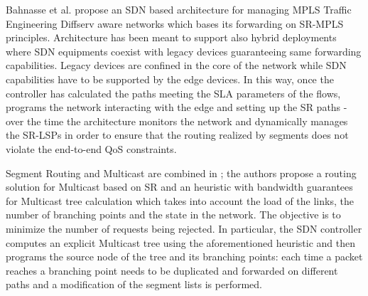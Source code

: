 Bahnasse et al. \cite{novelsdn} propose an SDN based architecture for managing MPLS Traffic Engineering Diffserv aware networks which bases its forwarding on SR-MPLS principles. Architecture has been meant to support also hybrid deployments where SDN equipments coexist with legacy devices guaranteeing same forwarding capabilities. Legacy devices are confined in the core of the network while SDN capabilities have to be supported by the edge devices. In this way, once the controller has calculated the paths meeting the SLA parameters of the flows, programs the network interacting with the edge and setting up the SR paths - over the time the architecture monitors the network and dynamically manages the SR-LSPs in order to ensure that the routing realized by segments does not violate the end-to-end QoS constraints.

Segment Routing and Multicast are combined in \cite{ascalableand}; the authors propose a routing solution for Multicast based on SR and an heuristic with bandwidth guarantees for Multicast tree calculation which takes into account the load of the links, the number of branching points and the state in the network. The objective is to minimize the number of requests being rejected. In particular, the SDN controller computes an explicit Multicast tree using the aforementioned heuristic and then programs the source node of the tree and its branching points: each time a packet reaches a branching point needs to be duplicated and forwarded on different paths and a modification of the segment lists is performed. 


